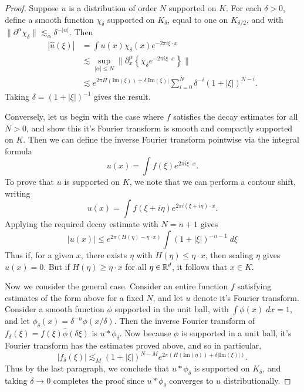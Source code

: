\begin{proof}
    Suppose $u$ is a distribution of order $N$ supported on $K$. For each $\delta > 0$, define a smooth function $\chi_\delta$ supported on $K_\delta$, equal to one on $K_{\delta/2}$, and with $\| \partial^\alpha \chi_\delta \| \lesssim_\alpha \delta^{-|\alpha|}$. Then
    \begin{align*}
        |\widehat{u}(\xi)| &= \int u(x) \chi_\delta(x) e^{-2 \pi i \xi \cdot x}\\
        &\lesssim \sup_{|\alpha| \leq N} \| \partial^\alpha_x \left\{ \chi_\delta e^{-2 \pi i \xi \cdot x} \right\} \|\\
        &\lesssim e^{2 \pi H(\text{Im}(\xi)) + \delta |\text{Im}(\xi)|} \sum_{i = 0}^N \delta^{-i} (1 + |\xi|)^{N-i}.
    \end{align*}
    Taking $\delta = (1 + |\xi|)^{-1}$ gives the result.

    Conversely, let us begin with the case where $f$ satisfies the decay estimates for all $N > 0$, and show this it's Fourier transform is smooth and compactly supported on $K$. Then we can define the inverse Fourier transform pointwise via the integral formula
    \[ u(x) = \int f(\xi) e^{2 \pi i \xi \cdot x}. \]
    To prove that $u$ is supported on $K$, we note that we can perform a contour shift, writing
    \[ u(x) = \int f(\xi + i \eta) e^{2 \pi i (\xi + i \eta) \cdot x}. \]
    Applying the required decay estimate with $N = n+1$ gives
    \[ |u(x)| \leq e^{2 \pi (H(\eta) - \eta \cdot x)} \int (1 + |\xi|)^{-n-1}\; d\xi \]
    Thus if, for a given $x$, there exists $\eta$ with $H(\eta) \leq \eta \cdot x$, then scaling $\eta$ gives $u(x) = 0$. But if $H(\eta) \geq \eta \cdot x$ for all $\eta \in \operatorname{\mathbb{R}}^d$, it follows that $x \in K$.

    Now we consider the general case. Consider an entire function $f$ satisfying estimates of the form above for a fixed $N$, and let $u$ denote it's Fourier transform. Consider a smooth function $\phi$ supported in the unit ball, with $\int \phi(x)\; dx = 1$, and let $\phi_\delta(x) = \delta^{-n} \phi(x/\delta)$. Then the inverse Fourier transform of $f_\delta(\xi) = f(\xi) \widehat{\phi}(\delta \xi)$ is $u * \phi_\delta$. Now because $\phi$ is supported in a unit ball, it's Fourier transform has the estimates proved above, and so in particular,
    \[ |f_\delta(\xi)| \lesssim_M (1 + |\xi|)^{N-M} e^{2 \pi (H(\text{Im}(\eta)) + \delta |\text{Im}(\xi)|)}. \]
    Thus by the last paragraph, we conclude that $u * \phi_\delta$ is supported on $K_\delta$, and taking $\delta \to 0$ completes the proof since $u * \phi_\delta$ converges to $u$ distributionally.
\end{proof}


